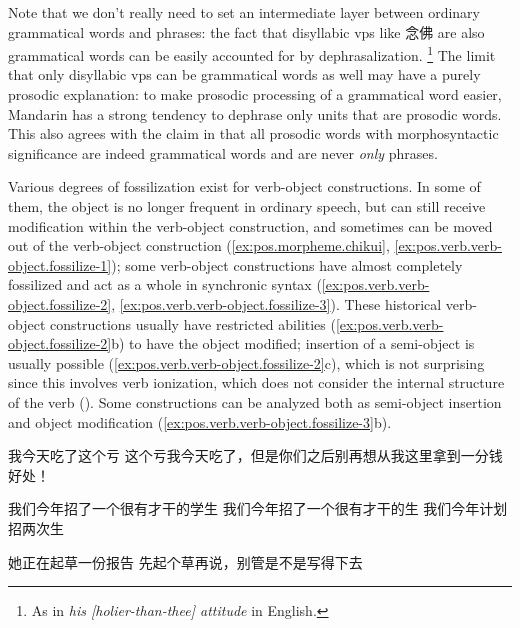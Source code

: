 \documentclass[UTF8, a4paper, oneside, scheme=plain, 12pt]{ctexrep}
\newcommand{\form}[1]{\emph{#1}}
\begin{document}
Note that we don't really need to set an intermediate layer 
between ordinary grammatical words and phrases:
the fact that disyllabic \acs{vp}s like 念佛 
are also grammatical words 
can be easily accounted for 
by dephrasalization.%
\footnote{
    As in \form{his [holier-than-thee] attitude} in English. 
}
The limit that only disyllabic \acs{vp}s 
can be grammatical words as well 
may have a purely prosodic explanation:
to make prosodic processing of a grammatical word easier,
Mandarin has a strong tendency to dephrase 
only units that are prosodic words. 
This also agrees with the claim in 
that all prosodic words with morphosyntactic significance 
are indeed grammatical words 
and are never \emph{only} phrases.

Various degrees of fossilization exist for verb-object constructions. 
In some of them, the object is no longer frequent 
in ordinary speech, 
but can still receive modification within the verb-object construction, 
and sometimes can be moved out of the verb-object construction
(\ref{ex:pos.morpheme.chikui}, \ref{ex:pos.verb.verb-object.fossilize-1}); 
some verb-object constructions have almost completely fossilized 
and act as a whole in synchronic syntax 
(\ref{ex:pos.verb.verb-object.fossilize-2},
\ref{ex:pos.verb.verb-object.fossilize-3}). 
These historical verb-object constructions usually have restricted abilities 
(\ref{ex:pos.verb.verb-object.fossilize-2}b)
to have the object modified; 
insertion of a semi-object is usually possible 
(\ref{ex:pos.verb.verb-object.fossilize-2}c),
which is not surprising since this involves verb ionization, 
which does not consider the internal structure of the verb 
().
Some constructions can be analyzed both 
as semi-object insertion 
and object modification 
(\ref{ex:pos.verb.verb-object.fossilize-3}b). 

\begin{exe}
    \ex\label{ex:pos.verb.verb-object.fossilize-1} \begin{xlist}
        \ex 我今天吃了这个亏
        \ex 这个亏我今天吃了，但是你们之后别再想从我这里拿到一分钱好处！
    \end{xlist}

    \ex\label{ex:pos.verb.verb-object.fossilize-2} \begin{xlist}
        \ex 我们今年招了一个很有才干的学生
        \ex *我们今年招了一个很有才干的生
        \ex 我们今年计划招两次生
    \end{xlist}

    \ex\label{ex:pos.verb.verb-object.fossilize-3} \begin{xlist}
        \ex 她正在起草一份报告
        \ex 先起个草再说，别管是不是写得下去
    \end{xlist}
\end{exe}
\end{document}
